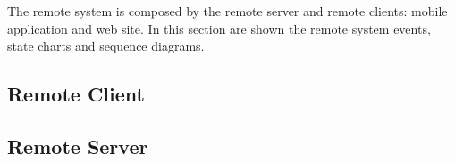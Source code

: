The remote system is composed by the remote server and remote clients: mobile application and web site. In this section are shown the remote system events, state charts and sequence diagrams.

\subsection{Remote Client}



\clearpage
\subsection{Remote Server}

